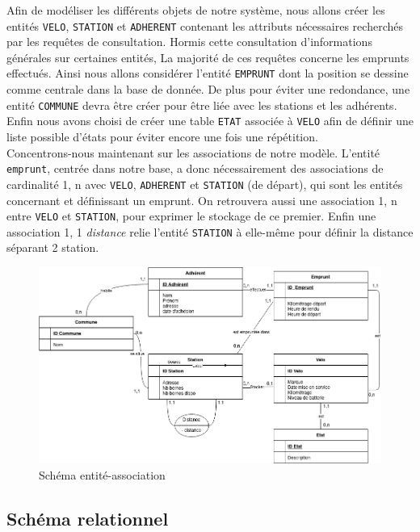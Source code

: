 \documentclass[10pt]{article}
\begin{document}
  Afin de modéliser les différents objets de notre système, nous allons créer les entités \texttt{VELO}, \texttt{STATION} et
  \texttt{ADHERENT} contenant les attributs nécessaires recherchés par les requêtes de consultation.
  Hormis cette consultation d'informations générales sur certaines entités, La majorité de ces requêtes concerne les emprunts effectués.
  Ainsi nous allons considérer l'entité \texttt{EMPRUNT}  dont la position se dessine comme centrale dans la base de donnée.
  De plus pour éviter une redondance, une entité \texttt{COMMUNE} devra être créer pour être liée avec les stations et les adhérents.
  Enfin nous avons choisi de créer une table \texttt{ETAT} associée à \texttt{VELO} afin de définir une liste possible d'états
  pour éviter encore une fois une répétition.\\

  Concentrons-nous maintenant sur les associations de notre modèle. L'entité \texttt{emprunt}, centrée dans notre base, a donc nécessairement
  des associations de cardinalité 1, n avec \texttt{VELO}, \texttt{ADHERENT} et \texttt{STATION} (de départ), qui sont les entités concernant et définissant
  un emprunt.
  On retrouvera aussi une association 1, n entre \texttt{VELO} et \texttt{STATION}, pour exprimer le stockage de ce premier.
  Enfin une association 1, 1 \textit{distance} relie l'entité \texttt{STATION} à elle-même pour définir la distance séparant
  2 station.\\

  \begin{figure}[!h]
    \centering
    \includegraphics[scale=0.5]{img/entite_association}
    \caption{Schéma entité-association}
    \label{fig:entite}
  \end{figure}

  \subsection{Schéma relationnel}\label{sec:relationel}
\end{document}
